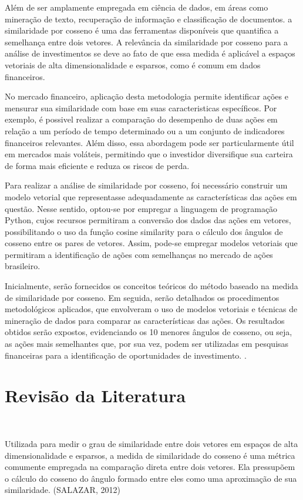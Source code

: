 \documentclass[12pt, a4paper]{article}
\begin{document}
Além de ser amplamente empregada em ciência de dados,  em áreas como mineração de texto, recuperação de informação e classificação de documentos. a similaridade por cosseno é uma das ferramentas disponíveis que quantifica a semelhança entre dois vetores. A relevância da similaridade por cosseno para a análise de investimentos se deve ao fato de que essa medida é aplicável a espaços vetoriais de alta dimensionalidade e esparsos, como é comum em dados financeiros.\

No mercado financeiro, aplicação desta metodologia permite identificar ações e mensurar sua similaridade com base em suas caracteristicas específicos. Por exemplo, é possivel realizar a comparação do desempenho de duas ações em relação a um período de tempo determinado ou a um conjunto de indicadores financeiros relevantes. Além disso, essa abordagem pode ser particularmente útil em mercados mais voláteis, permitindo que o investidor diversifique sua carteira de forma mais eficiente e reduza os riscos de perda. \

Para realizar a análise de similaridade por cosseno,  foi necessário construir um modelo vetorial que representasse adequadamente as características das ações em questão. Nesse sentido, optou-se por empregar a linguagem de programação Python, cujos recursos permitiram a conversão dos dados das ações em vetores, possibilitando o uso da função cosine similarity para o cálculo dos ângulos de cosseno entre os pares de vetores. Assim, pode-se empregar modelos vetoriais que permitiram a identificação de ações com semelhanças no mercado de ações brasileiro.\

Inicialmente, serão fornecidos os conceitos teóricos do método baseado na medida de similaridade por cosseno. Em seguida, serão detalhados os procedimentos metodológicos aplicados, que envolveram o uso de modelos vetoriais e técnicas de mineração de dados para comparar as características das ações. Os resultados obtidos serão expostos, evidenciando os 10 menores ângulos de cosseno, ou seja, as ações mais semelhantes que, por sua vez,  podem ser utilizadas em pesquisas financeiras para a identificação de oportunidades de investimento.
.\\

\section{Revisão da Literatura}\

Utilizada para medir o grau de similaridade entre dois vetores em espaços de alta dimensionalidade e esparsos, a medida de similaridade do cosseno é uma métrica comumente empregada na comparação direta entre dois vetores. Ela pressupõem o cálculo do cosseno do ângulo formado entre eles como uma aproximação de sua similaridade. (SALAZAR, 2012)\
\end{document}
